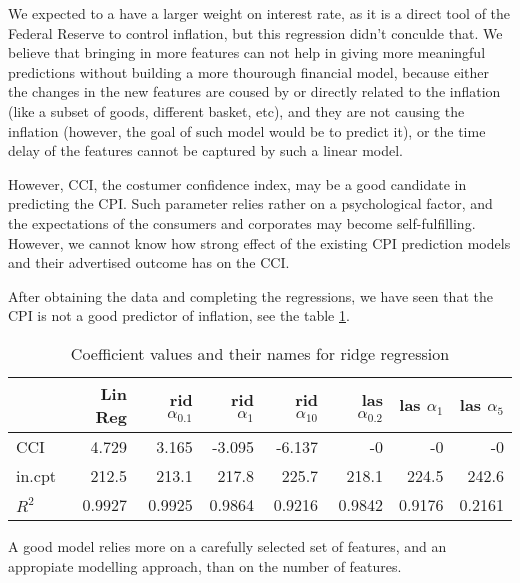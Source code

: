 \documentclass{article}
\begin{document}
We expected to a have a larger weight on interest rate,
as it is a direct tool of the Federal Reserve to control inflation,
but this regression didn't conculde that.
We believe that bringing in more features
can not help in giving more meaningful predictions
without building a more thourough financial model,
because either the changes in the new features are coused by
or directly related to the inflation
(like a subset of goods, different basket, etc),
and they are not causing the inflation
(however, the goal of such model would be to predict it),
or the time delay of the features cannot be captured by such a linear model.

However, CCI, the costumer confidence index, may be a good candidate in predicting the CPI.
Such parameter relies rather on a psychological factor,
and the expectations of the consumers and corporates may become self-fulfilling.
However, we cannot know how strong effect of the existing CPI prediction models
and their advertised outcome has on the CCI.

After obtaining the data and completing the regressions,
we have seen that the CPI is not a good predictor of inflation,
see the table \ref{tab:ridge_coefficients_CCI}.
\begin{table}
      \caption{Coefficient values and their names for ridge regression}
      \label{tab:ridge_coefficients_CCI}
      \begin{tabular}{lrrrrrrr}
            \toprule
                   & Lin Reg & rid $\alpha_{0.1}$ & rid $\alpha_{1}$ & rid $\alpha_{10}$ & las $\alpha_{0.2}$ & las $\alpha_{1}$ & las $\alpha_{5}$ \\
            \midrule
            CCI    & 4.729   & 3.165              & -3.095           & -6.137            & -0                 & -0               & -0               \\
            in.cpt & 212.5   & 213.1              & 217.8            & 225.7             & 218.1              & 224.5            & 242.6            \\
            $R^2$  & 0.9927  & 0.9925             & 0.9864           & 0.9216            & 0.9842             & 0.9176           & 0.2161           \\
            \bottomrule
      \end{tabular}
\end{table}

A good model relies more on a carefully selected set of features,
and an appropiate modelling approach, than on the number of features.



\end{document}
